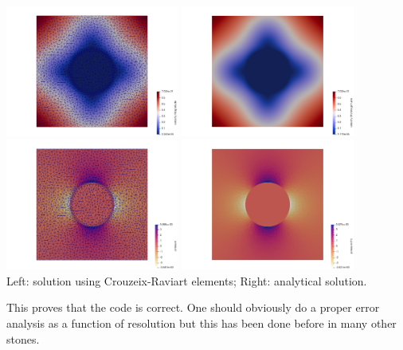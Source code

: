 \begin{center}
\includegraphics[width=5.7cm]{python_codes/fieldstone_142/results/case0/vel}
\includegraphics[width=5.7cm]{python_codes/fieldstone_142/results/case0/vel_th}\\
\includegraphics[width=5.7cm]{python_codes/fieldstone_142/results/case0/press}
\includegraphics[width=5.7cm]{python_codes/fieldstone_142/results/case0/press_th}\\
{\captionfont Left: solution using Crouzeix-Raviart elements; Right: analytical solution.}
\end{center}

This proves that the code is correct. One should obviously do a proper error analysis as a function 
of resolution but this has been done before in many other stones. 


